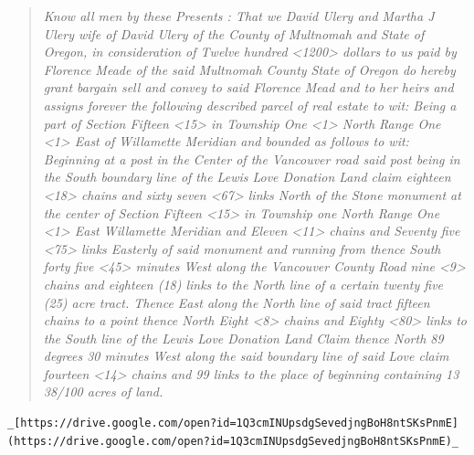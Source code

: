 \documentclass[
  12pt,
]{book}
\begin{document}
\begin{quote}
\emph{Know all men by these Presents : That we David Ulery and Martha J Ulery wife of David Ulery of the County of Multnomah and State of Oregon, in consideration of Twelve hundred \textless1200\textgreater{} dollars to us paid by Florence Meade of the said Multnomah County State of Oregon do hereby grant bargain sell and convey to said Florence Mead and to her heirs and assigns forever the following described parcel of real estate to wit: Being a part of Section Fifteen \textless15\textgreater{} in Township One \textless1\textgreater{} North Range One \textless1\textgreater{} East of Willamette Meridian and bounded as follows to wit: Beginning at a post in the Center of the Vancouver road said post being in the South boundary line of the Lewis Love Donation Land claim eighteen \textless18\textgreater{} chains and sixty seven \textless67\textgreater{} links North of the Stone monument at the center of Section Fifteen \textless15\textgreater{} in Township one North Range One \textless1\textgreater{} East Willamette Meridian and Eleven \textless11\textgreater{} chains and Seventy five \textless75\textgreater{} links Easterly of said monument and running from thence South forty five \textless45\textgreater{} minutes West along the Vancouver County Road nine \textless9\textgreater{} chains and eighteen (18) links to the North line of a certain twenty five (25) acre tract. Thence East along the North line of said tract fifteen chains to a point thence North Eight \textless8\textgreater{} chains and Eighty \textless80\textgreater{} links to the South line of the Lewis Love Donation Land Claim thence North 89 degrees 30 minutes West along the said boundary line of said Love claim fourteen \textless14\textgreater{} chains and 99 links to the place of beginning containing 13 38/100 acres of land.}
\end{quote}

\begin{verbatim}
_[https://drive.google.com/open?id=1Q3cmINUpsdgSevedjngBoH8ntSKsPnmE](https://drive.google.com/open?id=1Q3cmINUpsdgSevedjngBoH8ntSKsPnmE)_
\end{verbatim}
\end{document}
